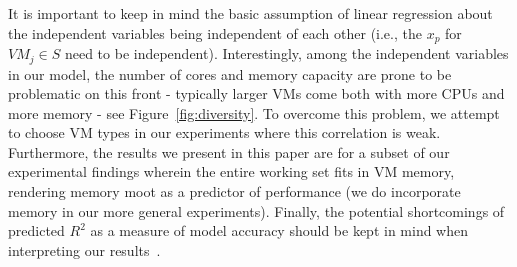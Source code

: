 It is important to keep in mind the basic assumption of linear regression about the independent variables being independent of each other (i.e., the $x_p$ for $VM_j\in S$ need to be independent). Interestingly, among the independent
variables in our model, the number of cores and memory capacity are prone to be problematic on this front - typically
larger VMs come both with more CPUs and more memory - see Figure~\ref{fig:diversity}. To overcome this problem, we attempt to choose VM types
in our experiments where this correlation is weak. Furthermore, the results we present in this paper are for a subset
of our experimental findings wherein the entire working set fits in VM memory, rendering memory moot as a predictor of
performance (we do incorporate memory in our more general experiments). Finally, the potential shortcomings of predicted 
$R^2$ as a measure of model accuracy should be kept in mind when interpreting our results~\cite{CMUStatsBook}. 
  
  

